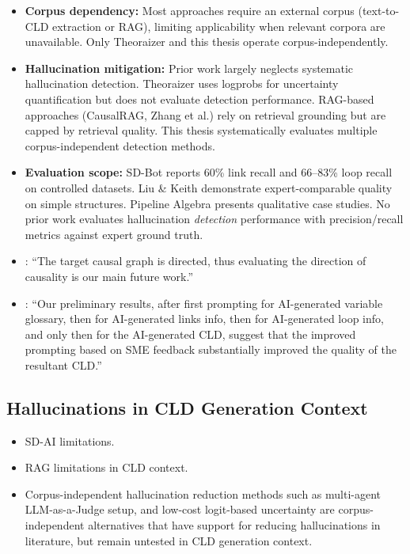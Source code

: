 \documentclass[12pt]{article}
\begin{document}
\begin{itemize}
    \item \textbf{Corpus dependency:} Most approaches require an external corpus (text-to-CLD extraction or RAG), limiting applicability when relevant corpora are unavailable. Only Theoraizer and this thesis operate corpus-independently.
    
    \item \textbf{Hallucination mitigation:} Prior work largely neglects systematic hallucination detection. Theoraizer uses logprobs for uncertainty quantification but does not evaluate detection performance. RAG-based approaches (CausalRAG, Zhang et al.) rely on retrieval grounding but are capped by retrieval quality. This thesis systematically evaluates multiple corpus-independent detection methods.
    
    \item \textbf{Evaluation scope:} SD-Bot reports 60\% link recall and 66--83\% loop recall on controlled datasets. Liu \& Keith demonstrate expert-comparable quality on simple structures. Pipeline Algebra presents qualitative case studies. No prior work evaluates hallucination \emph{detection} performance with precision/recall metrics against expert ground truth.
    
    \item \cite{susanti2025prompting}: ``The target causal graph is directed, thus evaluating the direction of causality is our main future work.''
    
    \item \cite{reinholtz2025pipelinealgebra}: ``Our preliminary results, after first prompting for AI-generated variable glossary, then for AI-generated links info, then for AI-generated loop info, and only then for the AI-generated CLD, suggest that the improved prompting based on SME feedback substantially improved the quality of the resultant CLD.''
\end{itemize}

\subsection{Hallucinations in CLD Generation Context}

\begin{itemize}
    \item SD-AI limitations.
    \item RAG limitations in CLD context.
    \item Corpus-independent hallucination reduction methods such as multi-agent LLM-as-a-Judge setup, and low-cost logit-based uncertainty are corpus-independent alternatives that have support for reducing hallucinations in literature, but remain untested in CLD generation context.
\end{itemize}
\end{document}

